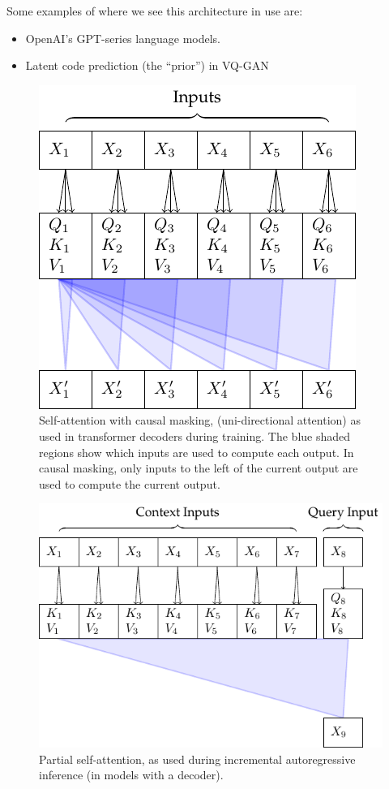 Some examples of where we see this architecture in use are:
\begin{itemize}
    \item OpenAI's GPT-series \cite{gpt2, gpt3} language models.
    \item Latent code prediction (the ``prior'') in VQ-GAN \cite{vqgan}
\end{itemize}


\begin{figure}
    \centering
    \includegraphics[]{figures/attn-3-causal.pdf}
    \caption[Self-attention with causal masking]{Self-attention with causal masking, (uni-directional attention) as used in transformer decoders during training. The blue shaded regions show which inputs are used to compute each output. In causal masking, only inputs to the left of the current output are used to compute the current output.}
    \label{fig:self-attn-causal}
\end{figure}

\begin{figure}
    \centering
    \includegraphics[]{figures/attn-4-partial.pdf}
    \caption[Partial self-attention]{Partial self-attention, as used during incremental autoregressive inference (in models with a decoder).}
    \label{fig:partial-self-attn}
\end{figure}


